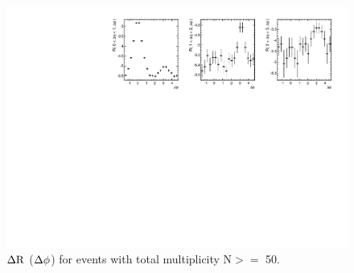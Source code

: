 

\begin{figure}[!htb]
\begin{center}
\includegraphics[width=.95\textwidth]{figures/canvasProjection_isBelle1_mult50.pdf}
\caption{$\rm \Delta R$ ($\rm \Delta\phi$) for events with total multiplicity N$>=$ 50. }
\label{fig:ProjectionMult50} 
\end{center}
\end{figure}
